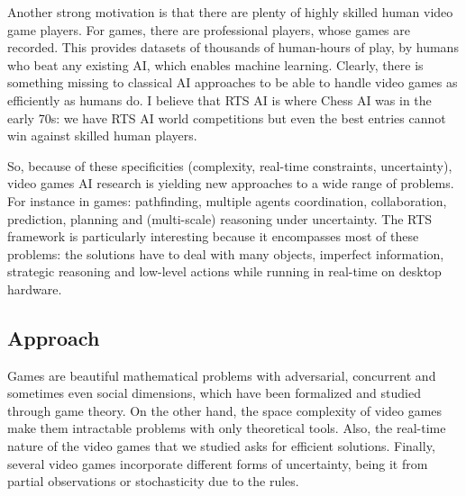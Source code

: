 Another strong motivation is that there are plenty of highly skilled human video game players. For  games, there are professional players, whose games are recorded. This provides datasets of thousands of human-hours of play, by humans who beat any existing AI, which enables machine learning. Clearly, there is something missing to classical AI approaches to be able to handle video games as efficiently as humans do. I believe that RTS AI is where Chess AI was in the early 70s: we have RTS AI world competitions but even the best entries cannot win against skilled human players.


So, because of these specificities (complexity, real-time constraints, uncertainty), video games AI research is yielding new approaches to a wide range of problems. For instance in  games: pathfinding, multiple agents coordination, collaboration, prediction, planning and (multi-scale) reasoning under uncertainty. The RTS framework is particularly interesting because it encompasses most of these problems: the solutions have to deal with many objects, imperfect information, strategic reasoning and low-level actions while running in real-time on desktop hardware.


\subsection{Approach}
Games are beautiful mathematical problems with adversarial, concurrent and sometimes even social dimensions, which have been formalized and studied through game theory. %
On the other hand, the space complexity of video games make them intractable problems with only theoretical tools. Also, the real-time nature of the video games that we studied asks for efficient solutions. Finally, several video games incorporate different forms of uncertainty, being it from partial observations or stochasticity due to the rules.

